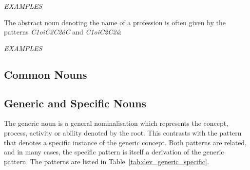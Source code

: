 \documentclass[grammar]{subfiles}
\begin{document}
	\begin{exe}
		\ex \emph{EXAMPLES}
	\end{exe}

	The abstract noun denoting the name of a profession is often given by the patterns \emph{C\sub1oiC\sub2C\sub2áC} and \emph{C\sub1oiC\sub2C\sub2á}:

	\begin{exe}
		\ex \emph{EXAMPLES}
	\end{exe}

	\subsection{Common Nouns}
	\label{ssec:dev_common_nouns}

	\ToBeWritten

	\subsection{Generic and Specific Nouns}
	\label{ssec:dev_generic_nouns}

	The generic noun is a general nominalisation which represents the concept, process, activity or ability denoted by the root. This contrasts with the pattern that denotes a specific instance of the generic concept. Both patterns are related, and in many cases, the specific pattern is itself a derivation of the generic pattern. The patterns are listed in Table~\ref{tab:dev_generic_specific}.
\end{document}
